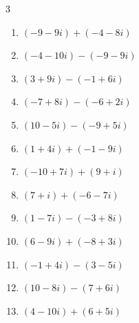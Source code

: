\begin{multicols}{3}
\begin{enumerate}
        \phantom{$\displaystyle =2-6i$}

  \item $\displaystyle (-9-9i) + (-4-8i)$

        \phantom{$\displaystyle =-13-17i$}

  \item $\displaystyle (-4-10i) - (-9-9i)$

        \phantom{$\displaystyle =5-i$}

  \item $\displaystyle (3+9i) - (-1+6i)$

        \phantom{$\displaystyle =4+3i$}

  \item $\displaystyle (-7+8i) - (-6+2i)$

        \phantom{$\displaystyle =-1+6i$}

  \item $\displaystyle (10-5i) - (-9+5i)$

        \phantom{$\displaystyle =19-10i$}

  \item $\displaystyle (1+4i) + (-1-9i)$

        \phantom{$\displaystyle =-5i$}

  \item $\displaystyle (-10+7i) + (9+i)$

        \phantom{$\displaystyle =-1+8i$}

  \item $\displaystyle (7+i) + (-6-7i)$

        \phantom{$\displaystyle =1-6i$}

  \item $\displaystyle (1-7i) - (-3+8i)$

        \phantom{$\displaystyle =4-15i$}

  \item $\displaystyle (6-9i) + (-8+3i)$

        \phantom{$\displaystyle =-2-6i$}

  \item $\displaystyle (-1+4i) - (3-5i)$

        \phantom{$\displaystyle =-4+9i$}

\columnbreak %

  \item $\displaystyle (10-8i) - (7+6i)$

        \phantom{$\displaystyle =3-14i$}

  \item $\displaystyle (4-10i) + (6+5i)$


\end{enumerate}
\end{multicols}
